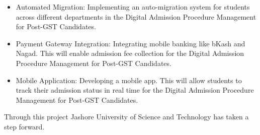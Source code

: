 \begin{itemize}
    \item {Automated Migration:} Implementing an auto-migration system for students across different departments in the Digital Admission Procedure Management for Post-GST Candidates.

    \item {Payment Gateway Integration:} Integrating mobile banking like bKash and Nagad. This will enable admission fee collection for the Digital Admission Procedure Management for Post-GST Candidates.

    \item {Mobile Application:} Developing a mobile app. This will allow students to track their admission status in real time for the Digital Admission Procedure Management for Post-GST Candidates.
\end{itemize}

\vspace{0.3cm}

\noindent Through this project Jashore University of Science and Technology has taken a step forward.

